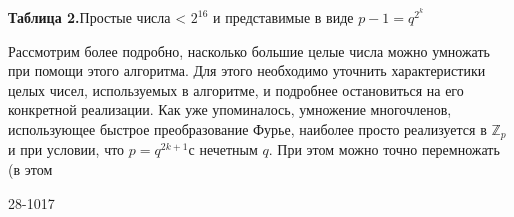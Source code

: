 \begin{flushleft}
\vspace{-18pt}
\textbf{Таблица 2.}Простые числа < $2^{16}$ и представимые в виде $p - 1 = q^{2^{k}}$
\end{flushleft}
\par
Рассмотрим более подробно, насколько большие целые числа можно\linebreak
умножать при помощи этого алгоритма. Для этого необходимо \linebreak
уточнить характеристики целых чисел, используемых в алгоритме, и \linebreak
подробнее остановиться на его конкретной реализации. Как уже \linebreak
упоминалось, умножение многочленов, использующее быстрое \linebreak
преобразование Фурье, наиболее просто реализуется в $\mathbb{Z}_p$ и при условии, что $p = q^{2k+1}$с нечетным $q$. При этом можно точно перемножать (в этом\linebreak 
\begin{flushleft}
\tiny
28-1017
\end{flushleft}
\pagebreak
\newpage


